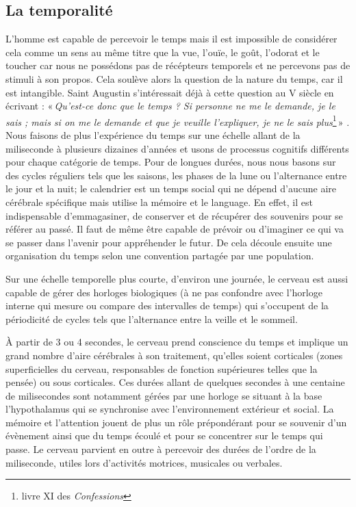 \documentclass[12pt,fleqn,oneside,french,openany]{book} %
\begin{document}
\subsection[La temporalité]{La temporalité \cite{reptemps,basePerception,perceptionTemps,tempsEtIllusions}} \label{ssec:temporalite} %

L'homme est capable de percevoir le temps mais il est impossible de considérer cela comme un sens au même titre que la vue, l'ouïe, le goût, l'odorat et le toucher car nous ne possédons pas de récépteurs temporels et ne percevons pas de stimuli à son propos. Cela soulève alors la question de la nature du temps, car il est intangible. Saint Augustin s'intéressait déjà à cette question au V siècle en écrivant : «\,\emph{Qu’est-ce donc que le temps ? Si personne ne me le demande, je le sais ; mais si on me le demande et que je veuille l’expliquer, je ne le sais plus}\footnote{livre XI des \emph{Confessions}}\,» \cite{augustin}. Nous faisons de plus l'expérience du temps sur une échelle allant de la miliseconde à plusieurs dizaines d'années et usons de processus cognitifs différents pour chaque catégorie de temps. Pour de longues durées, nous nous basons sur des cycles réguliers tels que les saisons, les phases de la lune ou l'alternance entre le jour et la nuit; le calendrier est un temps social qui ne dépend d'aucune aire cérébrale spécifique mais utilise la mémoire et le language. En effet, il est indispensable d'emmagasiner, de conserver et de récupérer des souvenirs pour se référer au passé. Il faut de même être capable de prévoir ou d'imaginer ce qui va se passer dans l'avenir pour appréhender le futur. De cela découle ensuite une organisation du temps selon une convention partagée par une population.

Sur une échelle temporelle plus courte, d'environ une journée, le cerveau est aussi capable de gérer des horloges biologiques (à ne pas confondre avec l'horloge interne qui mesure ou compare des intervalles de temps) qui s'occupent de la périodicité de cycles tels que l'alternance entre la veille et le sommeil. 

À partir de 3 ou 4 secondes, le cerveau prend conscience du temps et implique un grand nombre d'aire cérébrales à son traitement, qu'elles soient corticales (zones superficielles du cerveau, responsables de fonction supérieures telles que la pensée) ou sous corticales. Ces durées allant de quelques secondes à une centaine de milisecondes sont notamment gérées par une horloge se situant à la base l'hypothalamus qui se synchronise avec l'environnement extérieur et social. La mémoire et l'attention jouent de plus un rôle prépondérant pour se souvenir d'un évènement ainsi que du temps écoulé et pour se concentrer sur le temps qui passe. Le cerveau parvient en outre à percevoir des durées de l'ordre de la miliseconde, utiles lors d'activités motrices, musicales ou verbales.
\end{document}
